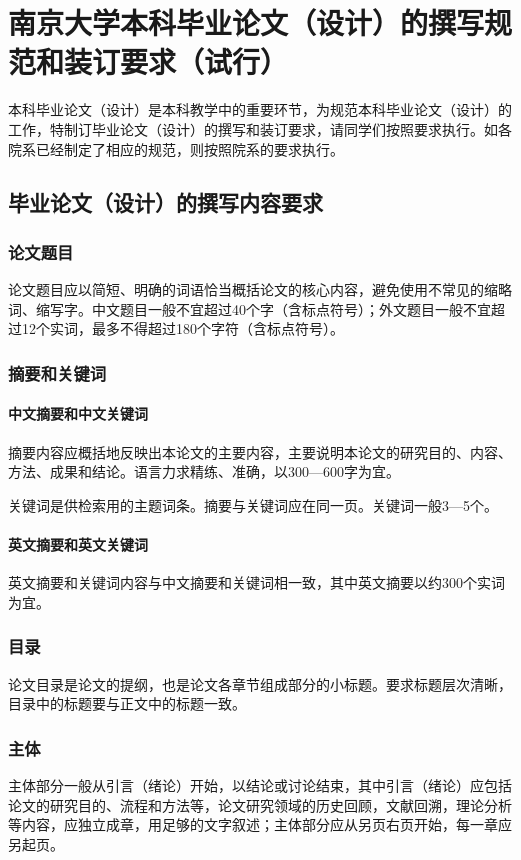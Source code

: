 \chapter[本科毕业论文格式规定]{南京大学本科毕业论文（设计）的撰写规范和装订要求（试行）}
\label{chap:standard}

本科毕业论文（设计）是本科教学中的重要环节，为规范本科毕业论文（设计）的工作，特制订毕业论文（设计）的撰写和装订要求，请同学们按照要求执行。如各院系已经制定了相应的规范，则按照院系的要求执行。

\section{毕业论文（设计）的撰写内容要求}
\subsection{论文题目}
论文题目应以简短、明确的词语恰当概括论文的核心内容，避免使用不常见的缩略词、缩写字。中文题目一般不宜超过40个字（含标点符号）；外文题目一般不宜超过12个实词，最多不得超过180个字符（含标点符号）。
\subsection{摘要和关键词}
\subsubsection{中文摘要和中文关键词}
摘要内容应概括地反映出本论文的主要内容，主要说明本论文的研究目的、内容、方法、成果和结论。语言力求精练、准确，以300—600字为宜。

关键词是供检索用的主题词条。摘要与关键词应在同一页。关键词一般3—5个。

\subsubsection{英文摘要和英文关键词}
英文摘要和关键词内容与中文摘要和关键词相一致，其中英文摘要以约300个实词为宜。

\subsection{目录}
论文目录是论文的提纲，也是论文各章节组成部分的小标题。要求标题层次清晰，目录中的标题要与正文中的标题一致。

\subsection{主体}
主体部分一般从引言（绪论）开始，以结论或讨论结束，其中引言（绪论）应包括论文的研究目的、流程和方法等，论文研究领域的历史回顾，文献回溯，理论分析等内容，应独立成章，用足够的文字叙述；主体部分应从另页右页开始，每一章应另起页。

